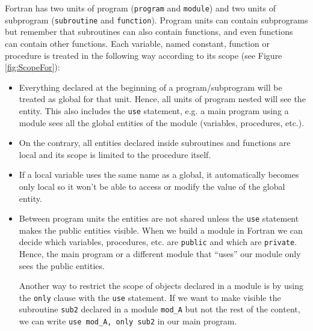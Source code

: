 Fortran has two units of program (\texttt{program} and \texttt{module}) and two units of subprogram (\texttt{subroutine} and \texttt{function}).
Program units can contain subprograms but remember that subroutines can also contain functions, and even functions can contain other functions. 
Each variable, named constant, function or procedure is treated in the following way according to its scope (see Figure \ref{fig:ScopeFor}):
\begin{itemize}
    \item Everything declared at the beginning of a program/subprogram will be treated as global for that unit. Hence, all units of program nested will see the entity.
    This also includes the \texttt{use} statement, e.g. a main program using a module sees all the global entities of the module (variables, procedures, etc.). 
    
    \item On the contrary, all entities declared inside subroutines and functions are local and its scope is limited to the procedure itself. 
    
    \item If a local variable uses the same name as a global, it automatically becomes only local so it won't be able to access or modify the value of the global entity. 
    
    \item Between program units the entities are not shared unless the \texttt{use} statement makes the public entities visible. 
    When we build a module in Fortran we can decide which variables, procedures, etc. are \texttt{public} and which are \texttt{private}. 
    Hence, the main program or a different module that ``uses'' our module only sees the public entities.
    
    Another way to restrict the scope of objects declared in a module is by using the \texttt{only} clause with the \texttt{use} statement. 
    If we want to make visible the subroutine \texttt{sub2} declared in a module \texttt{mod\_A} but not the rest of the content, we can write \texttt{use mod\_A, only sub2} in our main program. 
\end{itemize}

